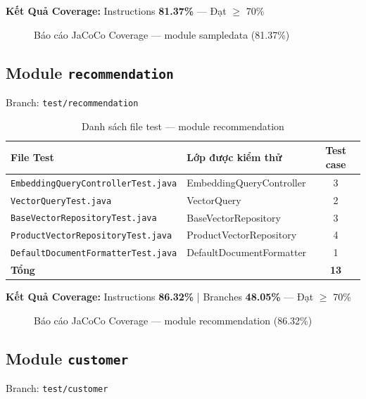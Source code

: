 \textbf{Kết Quả Coverage:} Instructions \textbf{81.37\%} --- Đạt $\geq$ 70\%

\begin{figure}[H]
\centering
{}
\caption{Báo cáo JaCoCo Coverage --- module sampledata (81.37\%)}
\end{figure}

\subsection{Module \texttt{recommendation}}

Branch: \texttt{test/recommendation}

\begin{table}[H]
\centering
\caption{Danh sách file test --- module recommendation}
\begin{tabular}{|l|l|c|}
\hline
\textbf{File Test} & \textbf{Lớp được kiểm thử} & \textbf{Test case} \\
\hline
\texttt{EmbeddingQueryControllerTest.java} & EmbeddingQueryController & 3 \\
\hline
\texttt{VectorQueryTest.java} & VectorQuery & 2 \\
\hline
\texttt{BaseVectorRepositoryTest.java} & BaseVectorRepository & 3 \\
\hline
\texttt{ProductVectorRepositoryTest.java} & ProductVectorRepository & 4 \\
\hline
\texttt{DefaultDocumentFormatterTest.java} & DefaultDocumentFormatter & 1 \\
\hline
\textbf{Tổng} & & \textbf{13} \\
\hline
\end{tabular}
\end{table}

\textbf{Kết Quả Coverage:} Instructions \textbf{86.32\%} | Branches \textbf{48.05\%} --- Đạt $\geq$ 70\%

\begin{figure}[H]
\centering
{}
\caption{Báo cáo JaCoCo Coverage --- module recommendation (86.32\%)}
\end{figure}

\subsection{Module \texttt{customer}}

Branch: \texttt{test/customer}

